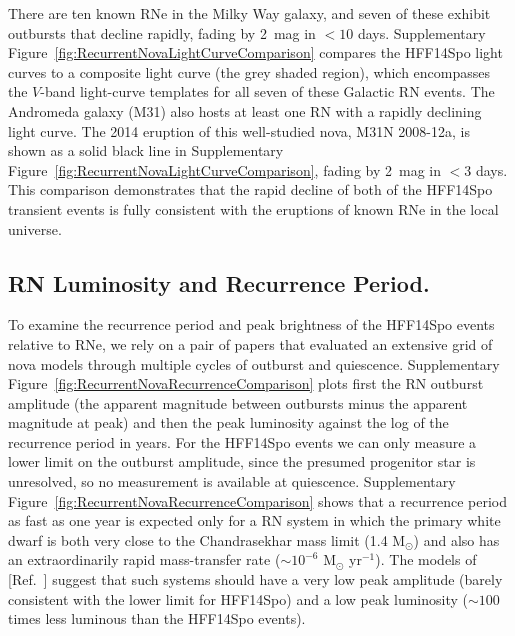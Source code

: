 \documentclass{article}
\newcommand{\citeref}[1]{[Ref.~{\citenum{#1}}]}
\providecommand\citep{\cite}
\def\Msun{\mbox{M$_{\odot}$}\xspace}
\def\spock{HFF14Spo\xspace}
\begin{document}
There are ten known RNe in the Milky Way galaxy, and seven of
these exhibit outbursts that decline rapidly, fading by 2~mag
in $<10$ days\citep{Schaefer:2010}. 
Supplementary Figure~\ref{fig:RecurrentNovaLightCurveComparison}
compares the \spock light curves to a composite light curve (the grey
shaded region), which encompasses the $V$-band light-curve
templates\citep{Schaefer:2010} for all seven of these Galactic RN
events.  The Andromeda galaxy (M31) also hosts at least one RN with a
rapidly declining light curve.  The 2014 eruption of this well-studied
nova, M31N 2008-12a, is shown as a solid black line in Supplementary
Figure~\ref{fig:RecurrentNovaLightCurveComparison}, fading by 2~mag in
$<3$ days.  This comparison demonstrates that the rapid decline of
both of the \spock transient events is fully consistent with the
eruptions of known RNe in the local universe.

\subsection{RN Luminosity and Recurrence Period.}\label{sec:RNLuminosityRecurrence}


To examine the recurrence period and peak brightness of the \spock
events relative to RNe, we rely on a pair of papers that evaluated an
extensive grid of nova models through multiple cycles of outburst and
quiescence\citep{Prialnik:1995,Yaron:2005}.  Supplementary
Figure~\ref{fig:RecurrentNovaRecurrenceComparison} plots first the RN
outburst amplitude (the apparent magnitude between outbursts minus the
apparent magnitude at peak) and then the peak luminosity against the
log of the recurrence period in years.
For the \spock events we can only measure a lower limit on the
outburst amplitude, since the presumed progenitor star is unresolved,
so no measurement is available at quiescence. Supplementary
Figure~\ref{fig:RecurrentNovaRecurrenceComparison} shows that a
recurrence period as fast as one year is expected only for a RN system
in which the primary white dwarf is both very close to the
Chandrasekhar mass limit (1.4 \Msun) and also has an extraordinarily
rapid mass-transfer rate ($\sim10^{-6}$ \Msun yr$^{-1}$).  The models
of \citeref{Yaron:2005} suggest that such systems should have a very
low peak amplitude (barely consistent with the lower limit for \spock)
and a low peak luminosity ($\sim100$ times less luminous than the
\spock events).
\end{document}
